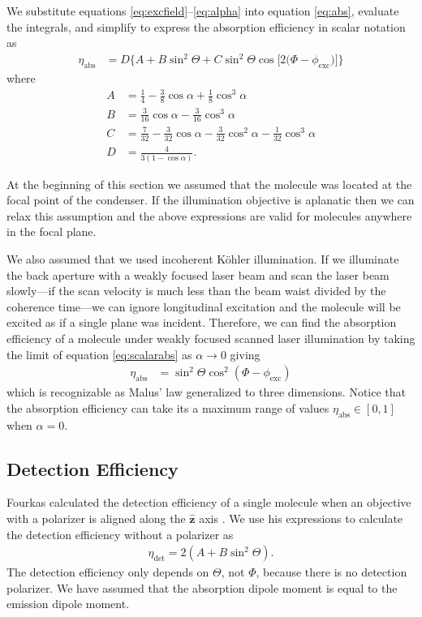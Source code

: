 \documentclass[10pt]{article}
\providecommand{\mh}[1]{\mathbf{\hat{#1}}}
\begin{document}
We substitute equations \ref{eq:excfield}--\ref{eq:alpha} into equation
\ref{eq:abs}, evaluate the integrals, and simplify to express the absorption
efficiency in scalar notation as
\begin{align}
  \eta_{\text{abs}} &= D\{A + B\sin^{2}{\Theta} + C\sin^{2}{\Theta} \cos{[2 (\Phi - \phi_{\text{exc}}})]\}\label{eq:scalarabs}
\end{align}
where
\begin{subequations}
\begin{align}
  A &= \frac{1}{4} - \frac{3}{8} \cos{\alpha } + \frac{1}{8} \cos^{3}{\alpha }\\
  B &= \frac{3}{16} \cos{\alpha } - \frac{3}{16} \cos^{3}{\alpha }\\
  C &= \frac{7}{32} - \frac{3}{32} \cos{\alpha } - \frac{3}{32} \cos^{2}{\alpha } - \frac{1}{32} \cos^{3}{\alpha}\\
  D &= \frac{4}{3(1 - \cos\alpha)}.
\end{align}\label{eq:coefficients}%
\end{subequations}

At the beginning of this section we assumed that the molecule was located at
the focal point of the condenser. If the illumination objective is aplanatic
then we can relax this assumption and the above expressions are valid for
molecules anywhere in the focal plane.

We also assumed that we used incoherent K\"ohler illumination. If we illuminate
the back aperture with a weakly focused laser beam and scan the laser beam
slowly---if the scan velocity is much less than the beam waist divided by the
coherence time---we can ignore longitudinal excitation and the molecule will
be excited as if a single plane was incident. Therefore, we can find the
absorption efficiency of a molecule under weakly focused scanned laser
illumination by taking the limit of equation \ref{eq:scalarabs} as
$\alpha \rightarrow 0$ giving
\begin{align}
  \eta_{\text{abs}} &= \sin^2\Theta\cos^2(\Phi - \phi_{\text{exc}})
\end{align}
which is recognizable as Malus' law generalized to three dimensions. Notice that
the absorption efficiency can take its a maximum range of values
$\eta_{\text{abs}} \in [0, 1]$ when $\alpha=0$.

\subsection{Detection Efficiency}\label{detection}
Fourkas calculated the detection efficiency of a single molecule when an
objective with a polarizer is aligned along the $\mh{z}$ axis
\cite{fourkas2001}. We use his expressions to calculate the detection efficiency
without a polarizer as
\begin{align}
  \eta_{\text{det}} = 2(A + B\sin^2\Theta). \label{eq:scalardet}
\end{align}
The detection efficiency only depends on $\Theta$, not $\Phi$, because there is
no detection polarizer. We have assumed that the absorption dipole moment is
equal to the emission dipole moment.
\end{document}
